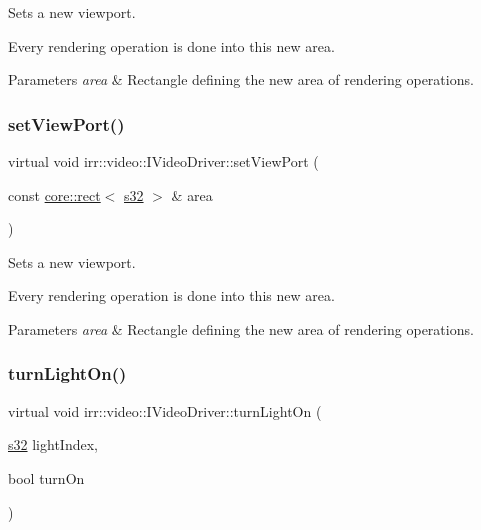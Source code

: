 Sets a new viewport. 

Every rendering operation is done into this new area. 
\begin{DoxyParams}{Parameters}
{\em area} & Rectangle defining the new area of rendering operations. \\
\hline
\end{DoxyParams}
\mbox{\label{classirr_1_1video_1_1IVideoDriver_af03cf9b67bb7b43a8021bbe4baa78a08}} 
\subsubsection{\texorpdfstring{set\+View\+Port()}{setViewPort()}\hspace{0.1cm}{\footnotesize\ttfamily [2/2]}}
{\footnotesize\ttfamily virtual void irr\+::video\+::\+I\+Video\+Driver\+::set\+View\+Port (\begin{DoxyParamCaption}\item[{const \hyperlink{classirr_1_1core_1_1rect}{core\+::rect}$<$ \hyperlink{namespaceirr_ac66849b7a6ed16e30ebede579f9b47c6}{s32} $>$ \&}]{area }\end{DoxyParamCaption})\hspace{0.3cm}{\ttfamily [pure virtual]}}



Sets a new viewport. 

Every rendering operation is done into this new area. 
\begin{DoxyParams}{Parameters}
{\em area} & Rectangle defining the new area of rendering operations. \\
\hline
\end{DoxyParams}
\mbox{\label{classirr_1_1video_1_1IVideoDriver_a3c26904f7d1bf0e37d51fe71562346a0}} 
\subsubsection{\texorpdfstring{turn\+Light\+On()}{turnLightOn()}\hspace{0.1cm}{\footnotesize\ttfamily [1/2]}}
{\footnotesize\ttfamily virtual void irr\+::video\+::\+I\+Video\+Driver\+::turn\+Light\+On (\begin{DoxyParamCaption}\item[{\hyperlink{namespaceirr_ac66849b7a6ed16e30ebede579f9b47c6}{s32}}]{light\+Index,  }\item[{bool}]{turn\+On }\end{DoxyParamCaption})\hspace{0.3cm}{\ttfamily [pure virtual]}}



